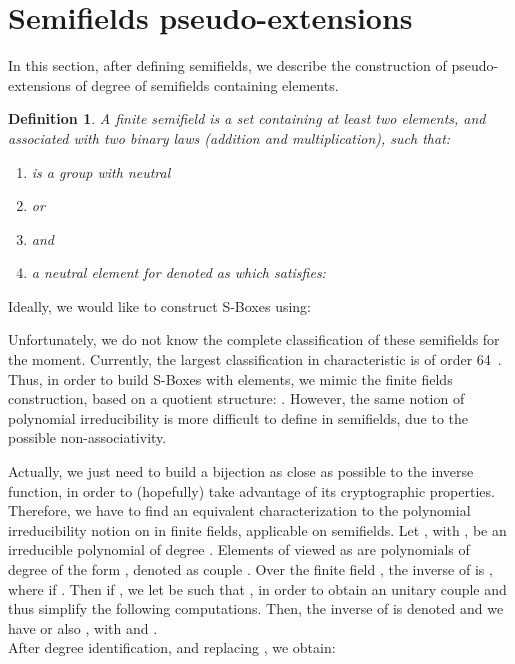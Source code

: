\documentclass{article}\usepackage{amsthm}
\newtheorem{mydef}{Definition}
\newcommand{\SBoxes}{S-Boxes\xspace}
\begin{document}
\section{Semifields pseudo-extensions}\label{sec:exten}
In this section, after defining semifields, we describe the construction of
pseudo-extensions of degree  of semifields containing  elements. 

\begin{mydef}
A finite semifield  is a set  containing at least two elements, and associated with two binary laws (addition and multiplication), such that: 
\begin{enumerate}
	\item  is a group with neutral 
	\item  or 
	\item  and 
	\item  a neutral element for  denoted as  which satisfies:  \\
\end{enumerate}
\end{mydef}

Ideally, we would like to construct \SBoxes using:


Unfortunately, we do not know the complete classification of these semifields for the moment. Currently, the 
largest classification in characteristic  is of order 64~\cite{Rua:2009:classification_sf}.
Thus, in order to build \SBoxes with  elements, we mimic the finite fields construction, based on a quotient structure: . 
However, the same notion of polynomial irreducibility is more difficult to
define in semifields, due to the possible non-associativity.




Actually, we just need to
build a bijection   as
close as possible to the inverse function, in order to (hopefully) take advantage of its cryptographic properties.
Therefore, we have to find an equivalent characterization to the polynomial irreducibility notion on in finite fields, applicable on semifields.
Let , with , 
be an irreducible polynomial of degree .
Elements of  viewed as  are polynomials of degree  of the form , denoted as couple .  
Over the finite field , the inverse of  is , where  if . Then if , 
we let  be such that , in order to obtain an unitary couple and thus simplify the following computations.
Then, the inverse of  is denoted  and we have  or also , with  and . \\
After degree identification, and replacing , we obtain: 
\end{document}
